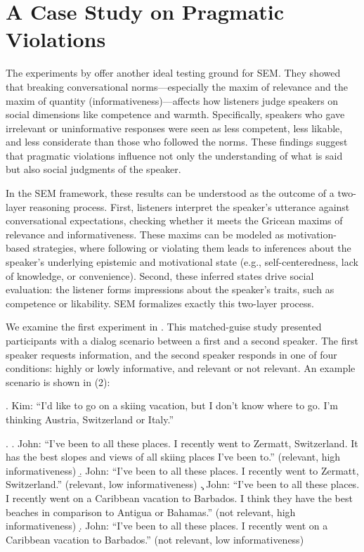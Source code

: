 \documentclass[12pt,a4paper]{article}
\begin{document}
\section{A Case Study on Pragmatic Violations}
\label{sec:violations}

The experiments by \citet{beltramapapafragou2023} offer another ideal testing
ground for SEM. They showed that breaking conversational norms---especially the
maxim of relevance and the maxim of quantity (informativeness)---affects how
listeners judge speakers on social dimensions like competence and warmth.
Specifically, speakers who gave irrelevant or uninformative responses were seen
as less competent, less likable, and less considerate than those who followed
the norms. These findings suggest that pragmatic violations influence not only
the understanding of what is said but also social judgments of the speaker.

In the SEM framework, these results can be understood as the outcome of a
two-layer reasoning process. First, listeners interpret the speaker's utterance
against conversational expectations, checking whether it meets the Gricean maxims
of relevance and informativeness. These maxims can be modeled as
motivation-based strategies, where following or violating them leads to inferences
about the speaker's underlying epistemic and motivational state (e.g.,
self-centeredness, lack of knowledge, or convenience). Second, these inferred
states drive social evaluation: the listener forms impressions about the speaker's
traits, such as competence or likability. SEM formalizes exactly this two-layer
process.

We examine the first experiment in \citet{beltramapapafragou2023}. This
matched-guise study presented participants with a dialog scenario between a first
and a second speaker. The first speaker requests information, and the second
speaker responds in one of four conditions: highly or lowly informative, and
relevant or not relevant. An example scenario is shown in (2):

\ex. Kim: ``I'd like to go on a skiing vacation, but I don't know where to go.
     I'm thinking Austria, Switzerland or Italy.''

\ex. \a. John: ``I've been to all these places. I recently went to Zermatt,
           Switzerland. It has the best slopes and views of all skiing places
           I've been to.'' \hfill(relevant, high informativeness)
      \b. John: ``I've been to all these places. I recently went to Zermatt,
           Switzerland.'' \hfill(relevant, low informativeness)
      \c. John: ``I've been to all these places. I recently went on a Caribbean
           vacation to Barbados. I think they have the best beaches in comparison
           to Antigua or Bahamas.'' \hfill(not relevant, high informativeness)
      \d. John: ``I've been to all these places. I recently went on a Caribbean
           vacation to Barbados.'' \hfill(not relevant, low informativeness)
\end{document}
